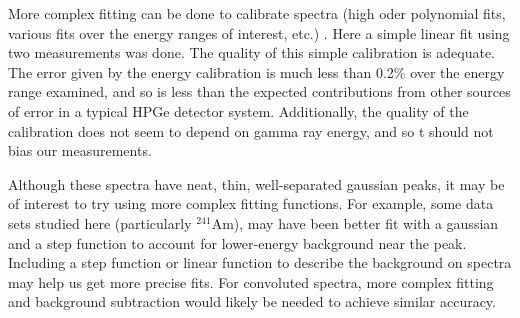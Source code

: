 More complex fitting can be done to calibrate spectra (high oder polynomial fits, various fits over the energy ranges of interest, etc.) \cite{Knoll:1300754}. Here a simple linear fit using two measurements was done. The quality of this simple calibration is adequate. The error given by the energy calibration is much less than 0.2$\%$ over the energy range examined, and so is less than the expected contributions from other sources of error in a typical HPGe detector system.  Additionally, the quality of the calibration does not seem to depend on gamma ray energy, and so t should not bias our measurements.

Although these spectra have neat, thin, well-separated gaussian peaks, it may be of interest to try using more complex fitting functions. For example, some data sets studied here (particularly ${}^{241}$Am), may have been better fit with a gaussian and a step function to account for lower-energy background near the peak. Including a step function or linear function to describe the background on spectra may help us get more precise fits. For convoluted spectra, more complex fitting and background subtraction would likely be needed to achieve similar accuracy.
